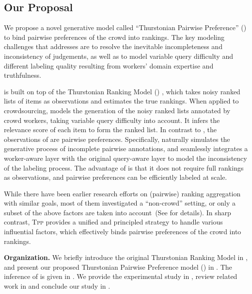\subsection{Our Proposal}

We propose a novel generative model called ``Thurstonian Pairwise Preference''
(\tpp{}) to bind pairwise preferences of the crowd into rankings.  The key
modeling challenges that \tpp{} addresses are to resolve the inevitable
incompleteness and inconsistency of judgements, as well as to model variable
query difficulty and different labeling quality resulting from workers' domain
expertise and truthfulness.

\tpp{} is built on top of the Thurstonian Ranking Model (\trm{})
\cite{thurstone1927law}, which takes noisy ranked lists of items as observations
and estimates the true rankings. When applied to crowdsourcing, \trm{} models
the generation of the noisy ranked lists annotated by crowd workers, taking
variable query difficulty into account. It infers the relevance score of each
item to form the ranked list. In contrast to \trm{}, the observations of \tpp{}
are pairwise preferences.  Specifically, \tpp{} naturally simulates the
generative process of incomplete pairwise annotations, and seamlessly integrates
a worker-aware layer with the original query-aware layer to model the
inconsistency of the labeling process.  The advantage of \tpp{} is that it does
not require full rankings as observations, and pairwise preferences can be
efficiently labeled at scale.

While there have been earlier research efforts on (pairwise) ranking aggregation
with similar goals, most of them investigated a ``non-crowd'' setting, or only a
subset of the above factors are taken into account~(See
 for details). In sharp contrast, \textsc{Tpp}
provides a unified and principled strategy to handle various influential
factors, which  effectively binds pairwise preferences of the crowd into
rankings.

\noindent \textbf{Organization.} We briefly introduce the original Thurstonian
Ranking Model in , and present our proposed Thurstonian
Pairwise Preference model (\tpp{}) in . The inference of
\tpp{} is given in . We provide the experimental study in
, review related work in  and
conclude our study in .
